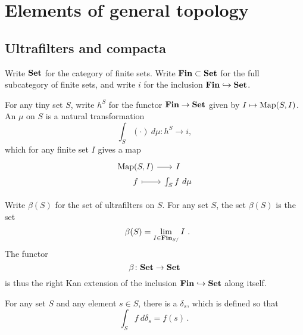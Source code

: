 
\section{Elements of general topology}

\subsection{Ultrafilters and compacta}

\begin{ntn}
	Write $ \textbf{\textup{Set}} $ for the category of finite sets.
	Write $ \textbf{\textup{Fin}} \subset \textbf{\textup{Set}} $ for the full subcategory of finite sets,
	and write $ i $ for the inclusion $ \textbf{\textup{Fin}} \hookrightarrow \textbf{\textup{Set}}$.
\end{ntn}

\begin{dfn}
	For any tiny set $ S $, write $ h^S $ for the functor $ \textbf{\textup{Fin}} \to \textbf{\textup{Set}} $ given by $ I  \mapsto \operatorname{Map}(S, I) $.
	An  $ \mu $ on $ S $ is a natural transformation
	\[
		\int_S (\cdot) \ d\mu \colon h^S \to i \comma
	\]
	which for any finite set $I$ gives a map
	\[
		\begin{tikzcd}[column sep={1ex}, row sep={0ex}]
			\Map(S, I) \ar[r] & I \\
			f \ar[r, mapsto] & \int_S f \ d \mu
		\end{tikzcd}
	\]

	Write $ \beta (S) $ for the set of ultrafilters on $ S $.
	For any set $ S $, the set $ \beta(S) $ is the set
	\[
		\beta(S) = \lim_{I \in \Fin_{S/}} I \period
	\]
	The functor
	\[
		\beta \colon \textbf{\textup{Set}} \to \textbf{\textup{Set}}
	\]
	is thus the right Kan extension of the inclusion $ \textbf{\textup{Fin}} \hookrightarrow \textbf{\textup{Set}} $ along itself.
\end{dfn}

\begin{exm}
	For any set $ S $ and any element $ s \in S $, there is a  $ \delta_s $, which is defined so that
	\[
		\int_S f \ d \delta_s = f(s) \period
	\]
\end{exm}

